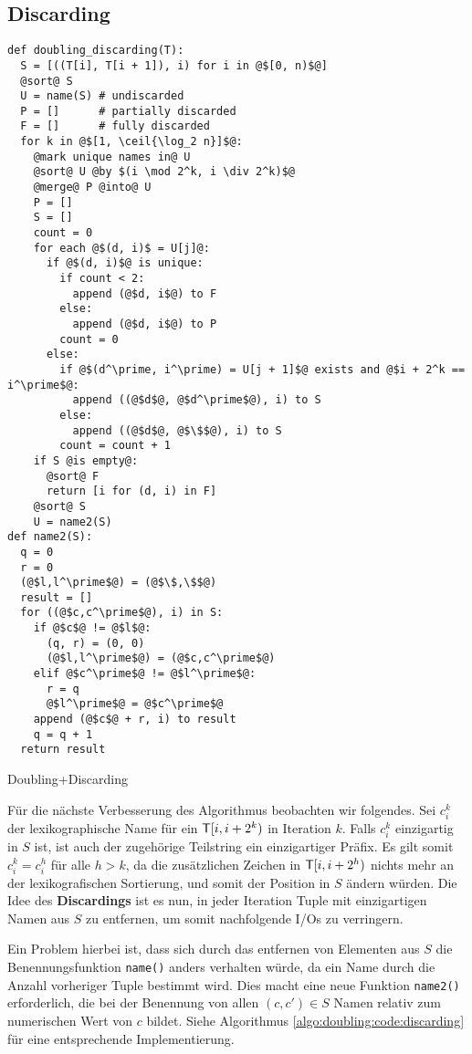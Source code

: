 \subsection{Discarding}
\label{algo:doubling:sec:discarding}

\begin{listing}[htp]
\begin{verbatim}
def doubling_discarding(T):
  S = [((T[i], T[i + 1]), i) for i in @$[0, n)$@]
  @sort@ S
  U = name(S) # undiscarded
  P = []      # partially discarded
  F = []      # fully discarded
  for k in @$[1, \ceil{\log_2 n}]$@:
    @mark unique names in@ U
    @sort@ U @by $(i \mod 2^k, i \div 2^k)$@
    @merge@ P @into@ U
    P = []
    S = []
    count = 0
    for each @$(d, i)$ = U[j]@:
      if @$(d, i)$@ is unique:
        if count < 2:
          append (@$d, i$@) to F
        else:
          append (@$d, i$@) to P
        count = 0
      else:
        if @$(d^\prime, i^\prime) = U[j + 1]$@ exists and @$i + 2^k == i^\prime$@:
          append ((@$d$@, @$d^\prime$@), i) to S
        else:
          append ((@$d$@, @$\$$@), i) to S
        count = count + 1
    if S @is empty@:
      @sort@ F
      return [i for (d, i) in F]
    @sort@ S
    U = name2(S)
def name2(S):
  q = 0
  r = 0
  (@$l,l^\prime$@) = (@$\$,\$$@)
  result = []
  for ((@$c,c^\prime$@), i) in S:
    if @$c$@ != @$l$@:
      (q, r) = (0, 0)
      (@$l,l^\prime$@) = (@$c,c^\prime$@)
    elif @$c^\prime$@ != @$l^\prime$@:
      r = q
      @$l^\prime$@ = @$c^\prime$@
    append (@$c$@ + r, i) to result
    q = q + 1
  return result
\end{verbatim}
\caption{Doubling+Discarding} 
\label{algo:doubling:code:discarding}
\end{listing}

Für die nächste Verbesserung des Algorithmus beobachten wir folgendes. Sei $c_i^k$ der lexikographische Name für ein $\inputtext{}[i, i + 2^k)$ in Iteration $k$. Falls $c_i^k$ einzigartig in $S$ ist, ist auch der zugehörige Teilstring ein einzigartiger Präfix. Es gilt somit $c_i^k = c_i^h$ für alle $h > k$, da die zusätzlichen Zeichen in $\inputtext{}[i, i + 2^h)$ nichts mehr an der lexikografischen Sortierung, und somit der Position in $S$ ändern würden. Die Idee des \textbf{Discardings} ist es nun, in jeder Iteration Tuple mit einzigartigen Namen aus $S$ zu entfernen, um somit nachfolgende I/Os zu verringern. 

Ein Problem hierbei ist, dass sich durch das entfernen von Elementen aus $S$ die Benennungsfunktion \texttt{name()} anders verhalten würde, da ein Name durch die Anzahl vorheriger Tuple bestimmt wird. Dies macht eine neue Funktion \texttt{name2()} erforderlich, die bei der Benennung von allen $(c, c') \in S$ Namen relativ zum numerischen Wert von $c$ bildet. Siehe Algorithmus \ref{algo:doubling:code:discarding} für eine entsprechende Implementierung.

